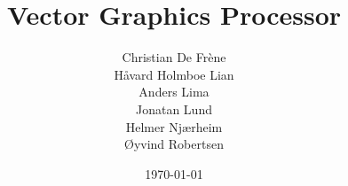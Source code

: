 \newcommand{\mytitle}{Vector Graphics Processor}
\newcommand{\myauthor}{Christian De Frène\\Håvard Holmboe Lian\\Anders Lima\\Jonatan Lund\\Helmer Njærheim\\Øyvind Robertsen\\}

\title{\mytitle}
\author{\myauthor}
\date{\today}
